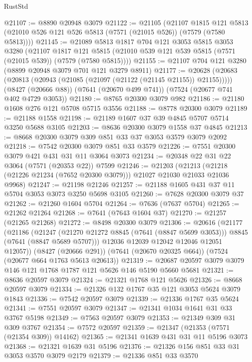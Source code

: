 \begin{lexlean}{RustStd}
\begin{coremodule}
@21107 := @8890 @20948 @3079
@21122 := @21105
    (@21107
      @1815
      @121
      @5813
      (@21010 @526 @121 @526 @5813 (@7571 (@21015 @526)) (@7579 (@7580 @5813))))
@21145 := @21089
    @5813
    @1817
    @704
    @121
    @3053
    @5815
    @3053
    @3280
    (@21107
      @1817
      @121
      @5815
      (@21010 @539 @121 @539 @5815 (@7571 (@21015 @539)) (@7579 (@7580 @5815))))
@21155 := @21107 @704 @121 @3280 (@8899 @20948 @3079 @701 @121 @3279 @8911)
@21177 := @20628
    (@20683 (@20813 (@20943 (@21085 (@21097 (@21122 (@21145 @21155)) @21155)))))
    (@8427 (@20666 @88))
    (@7641 (@20670 @499 @741))
    (@7524 (@20677 @741 @402 @4729 @3053))
@21180 := @8765 @20300 @3079 @982
@21186 := @21180 @1608 @276 @121 @5708 @5715 @3556
@21188 := @8778 @20300 @3079
@21189 := @21188 @1558
@21198 := @21189 @1607 @37 @39 @4845 @5707 @5714 @3250 @5688 @3105
@21203 := @8636 @20300 @3079 @1558 @37 @4845
@21213 := @8668 @20300 @3079 @309 @851 @33 @37 @3053 @3579 @3079 @2092
@21218 := @7542 @20300 @3079 @851 @33 @3579
@21226 := @7551 @20300 @3079 @421 @431 @31 @11 @3064 @3073
@21234 := @20348 @22 @31 @22 @3064 (@7571 (@20353 @22)) @7599
@21246 := @21203
    (@21213 (@21218 (@21226 @21234 (@7652 @20300 @3079))) @21027 @21030 @21033 @21036 @9968)
@21247 := @21198 @21246
@21257 := @21188 @1605 @431 @37 @11 @5704 @3053 @3073 @3250 @5698 @3105
@21260 := @7628 @20300 @3079 @37
@21262 := @21260 @1604 @5704
@21264 := @7636 (@7637 @5704)
@21265 := @21262 @21264
@21268 := @7641 (@7643 @1604 @37)
@21270 := @21257 (@21265 @21268)
@21272 := @8498 @20300 @3079
@21306 := @20616
    (@21177
      (@21186
        (@21247 (@21270 @21272 @8845 (@7641 (@8847 @5699 @3053))) @8845 (@7641 (@8847 @5689 @5707)))
        @12036
        @12039
        @12042
        @12046
        @12051
        @12057))
    (@8427 (@20666 @291))
    (@7641 (@20670 @20325 @664))
    (@7524 (@20677 @664 @1763 @5613 @20613))
@21319 := @20687 @20597 @3079 @3079 @146 @121 @1768 @1787 @121 @5626 @146 @5190 @5660 @5681
@21321 := @8636 @20597 @3079
@21324 := @21321 @1768 @121 @5626
@21326 := @8668 @20597 @3079
@21334 := @21326 @132 @1767 @35 @121 @3053 @5624 @3079 @1843
@21336 := @7542 @20597 @3079
@21339 := @21336 @1767 @35 @5624
@21341 := @7551 @20597 @3079
@21347 := @21341 @1034 @1641 @31 @33 @3767 @5198
@21349 := @7563 @20597 @3079
@21353 := @21349 @309 @31 @309 @3767
@21354 := @7572 @20597
@21359 := @21347 (@21353 (@7571 (@21354 @309)) @14162)
@21365 := @21341 @1639 @431 @31 @11 @5196 @3073
@21368 := @21321 @1639 @31 @5196
@21376 := @21326 @156 @851 @33 @31 @3053 @3570 @3079 @2179
@21379 := @21336 @851 @33 @3570

\end{coremodule}
\end{lexlean}
